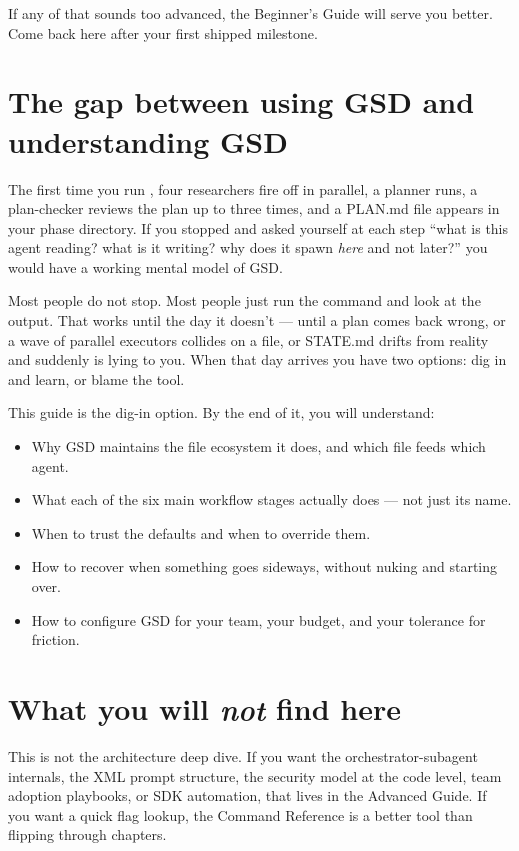 \documentclass[11pt,letterpaper,openany]{book}
\begin{document}
If any of that sounds too advanced, the Beginner's Guide will serve you better. Come back here after your first shipped milestone.

\section{The gap between using GSD and understanding GSD}

The first time you run , four researchers fire off in parallel, a planner runs, a plan-checker reviews the plan up to three times, and a PLAN.md file appears in your phase directory. If you stopped and asked yourself at each step ``what is this agent reading? what is it writing? why does it spawn \emph{here} and not later?'' you would have a working mental model of GSD.

Most people do not stop. Most people just run the command and look at the output. That works until the day it doesn't --- until a plan comes back wrong, or a wave of parallel executors collides on a file, or STATE.md drifts from reality and suddenly  is lying to you. When that day arrives you have two options: dig in and learn, or blame the tool.

This guide is the dig-in option. By the end of it, you will understand:

\begin{itemize}[itemsep=2pt]
  \item Why GSD maintains the file ecosystem it does, and which file feeds which agent.
  \item What each of the six main workflow stages actually does --- not just its name.
  \item When to trust the defaults and when to override them.
  \item How to recover when something goes sideways, without nuking  and starting over.
  \item How to configure GSD for your team, your budget, and your tolerance for friction.
\end{itemize}

\section{What you will \emph{not} find here}

This is not the architecture deep dive. If you want the orchestrator-subagent internals, the XML prompt structure, the security model at the code level, team adoption playbooks, or SDK automation, that lives in the Advanced Guide. If you want a quick flag lookup, the Command Reference is a better tool than flipping through chapters.
\end{document}
